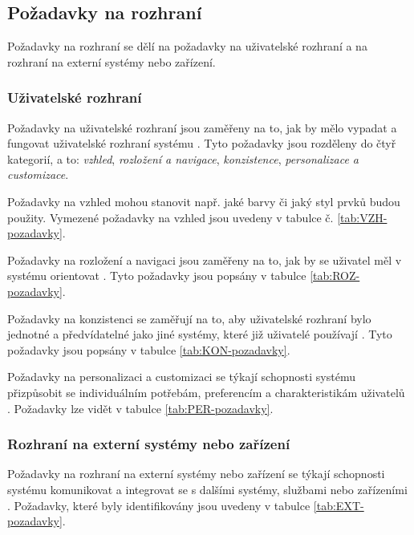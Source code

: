 \subsection{Požadavky na rozhraní}

Požadavky na rozhraní se dělí na požadavky na uživatelské rozhraní a na rozhraní na externí systémy nebo zařízení.

\subsubsection{Uživatelské rozhraní}

Požadavky na uživatelské rozhraní jsou zaměřeny na to, jak by mělo vypadat a fungovat uživatelské rozhraní systému \parencite{rejnkovaLokalizacePrizpusobeniMetodiky}. Tyto požadavky jsou rozděleny do čtyř kategorií, a to:
\textit{vzhled},
\textit{rozložení a navigace},
\textit{konzistence},
\textit{personalizace a customizace}.

Požadavky na vzhled mohou stanovit např. jaké barvy \parencite{rejnkovaLokalizacePrizpusobeniMetodiky} či jaký styl prvků budou použity. Vymezené požadavky na vzhled jsou uvedeny v tabulce č. \ref{tab:VZH-pozadavky}.

Požadavky na rozložení a navigaci jsou zaměřeny na to, jak by se uživatel měl v systému orientovat \parencite{rejnkovaLokalizacePrizpusobeniMetodiky}. Tyto požadavky jsou popsány v tabulce \ref{tab:ROZ-pozadavky}.

Požadavky na konzistenci se zaměřují na to, aby uživatelské rozhraní bylo jednotné a předvídatelné jako jiné systémy, které již uživatelé používají \parencite{rejnkovaLokalizacePrizpusobeniMetodiky}. Tyto požadavky jsou popsány v tabulce \ref{tab:KON-pozadavky}.

Požadavky na personalizaci a customizaci se týkají schopnosti systému přizpůsobit se individuálním potřebám, preferencím a charakteristikám uživatelů \parencite{rejnkovaLokalizacePrizpusobeniMetodiky}.
Požadavky lze vidět v tabulce \ref{tab:PER-pozadavky}.

\subsubsection{Rozhraní na externí systémy nebo zařízení}

Požadavky na rozhraní na externí systémy nebo zařízení se týkají schopnosti systému komunikovat a integrovat se s dalšími systémy, službami nebo zařízeními \parencite{rejnkovaLokalizacePrizpusobeniMetodiky}. Požadavky, které byly identifikovány jsou uvedeny v tabulce \ref{tab:EXT-pozadavky}.

